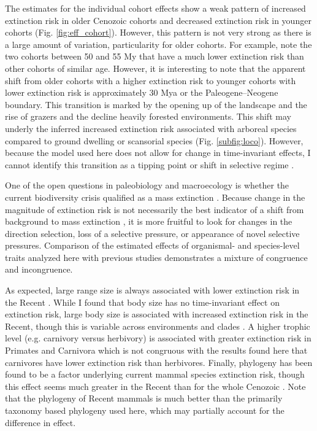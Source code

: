 \documentclass{nature}
\begin{document}
The estimates for the individual cohort effects show a weak pattern of increased extinction risk in older Cenozoic cohorts and decreased extinction risk in younger cohorts (Fig. \ref{fig:eff_cohort}). However, this pattern is not very strong as there is a large amount of variation, particularity for older cohorts. For example, note the two cohorts between 50 and 55 My that have a much lower extinction risk than other cohorts of similar age. However, it is interesting to note that the apparent shift from older cohorts with a higher extinction risk to younger cohorts with lower extinction risk is approximately 30 Mya or the Paleogene--Neogene boundary. This transition is marked by the opening up of the landscape and the rise of grazers and the decline heavily forested environments. This shift may underly the inferred increased extinction risk associated with arboreal species compared to ground dwelling or scansorial species (Fig. \ref{subfig:loco}). However, because the model used here does not allow for change in time-invariant effects, I cannot identify this transition as a tipping point or shift in selective regime \cite{Barnosky2012a,Barnosky2011}.

One of the open questions in paleobiology and macroecology is whether the current biodiversity crisis qualified as a mass extinction \cite{Alroy2010,Barnosky2011,Barnosky2012a}. Because change in the magnitude of extinction risk is not necessarily the best indicator of a shift from background to mass extinction \cite{Wang2003}, it is more fruitful to look for changes in the direction selection, loss of a selective pressure, or appearance of novel selective pressures. Comparison of the estimated effects of organismal- and species-level traits analyzed here with previous studies demonstrates a mixture of congruence and incongruence. 

As expected, large range size is always associated with lower extinction risk in the Recent \cite{Fritz2009,Fritz2010b,Liow2009,Purvis2000a}. While I found that body size has no time-invariant effect on extinction risk, large body size is associated with increased extinction risk in the Recent, though this is variable across environments and clades \cite{Liow2009,Fritz2009,Purvis2000a}. A higher trophic level (e.g. carnivory versus herbivory) is associated with greater extinction risk in Primates and Carnivora \cite{Purvis2000a} which is not congruous with the results found here that carnivores have lower extinction risk than herbivores. Finally, phylogeny has been found to be a factor underlying current mammal species extinction risk, though this effect seems much greater in the Recent than for the whole Cenozoic \cite{Fritz2010b}. Note that the phylogeny of Recent mammals is much better than the primarily taxonomy based phylogeny used here, which may partially account for the difference in effect.
\end{document}
